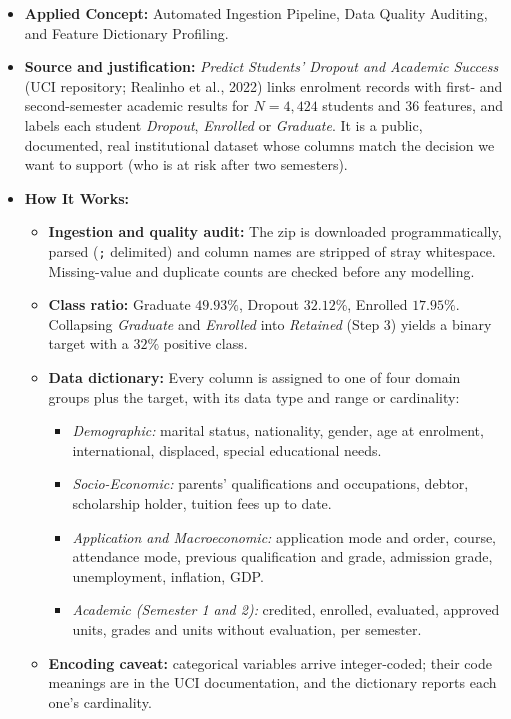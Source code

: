 \documentclass[11pt]{article}
\providecommand{\tightlist}{%
      \setlength{\itemsep}{0pt}\setlength{\parskip}{0pt}}
\begin{document}
\begin{itemize}
\tightlist
\item
  \textbf{Applied Concept:} Automated Ingestion Pipeline, Data Quality
  Auditing, and Feature Dictionary Profiling.
\item
  \textbf{Source and justification:} \emph{Predict Students' Dropout and
  Academic Success} (UCI repository; Realinho et al., 2022) links
  enrolment records with first- and second-semester academic results for
  \(N = 4,424\) students and 36 features, and labels each student
  \emph{Dropout}, \emph{Enrolled} or \emph{Graduate}. It is a public,
  documented, real institutional dataset whose columns match the
  decision we want to support (who is at risk after two semesters).
\item
  \textbf{How It Works:}

  \begin{itemize}
  \tightlist
  \item
    \textbf{Ingestion and quality audit:} The zip is downloaded
    programmatically, parsed (\texttt{;} delimited) and column names are
    stripped of stray whitespace. Missing-value and duplicate counts are
    checked before any modelling.
  \item
    \textbf{Class ratio:} Graduate \(49.93\%\), Dropout \(32.12\%\),
    Enrolled \(17.95\%\). Collapsing \emph{Graduate} and \emph{Enrolled}
    into \emph{Retained} (Step 3) yields a binary target with a \(32\%\)
    positive class.
  \item
    \textbf{Data dictionary:} Every column is assigned to one of four
    domain groups plus the target, with its data type and range or
    cardinality:

    \begin{itemize}
    \tightlist
    \item
      \emph{Demographic:} marital status, nationality, gender, age at
      enrolment, international, displaced, special educational needs.
    \item
      \emph{Socio-Economic:} parents' qualifications and occupations,
      debtor, scholarship holder, tuition fees up to date.
    \item
      \emph{Application and Macroeconomic:} application mode and order,
      course, attendance mode, previous qualification and grade,
      admission grade, unemployment, inflation, GDP.
    \item
      \emph{Academic (Semester 1 and 2):} credited, enrolled, evaluated,
      approved units, grades and units without evaluation, per semester.
    \end{itemize}
  \item
    \textbf{Encoding caveat:} categorical variables arrive
    integer-coded; their code meanings are in the UCI documentation, and
    the dictionary reports each one's cardinality.
  \end{itemize}
\end{itemize}
\end{document}
